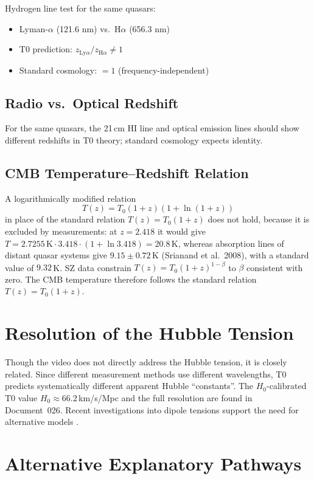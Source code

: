 	Hydrogen line test for the same quasars:
	\begin{itemize}
		\item Lyman-$\alpha$ (121.6 nm) vs.\ H$\alpha$ (656.3 nm)
		\item T0 prediction: $z_{\mathrm{Ly}\alpha} / z_{\mathrm{H}\alpha} \neq 1$
		\item Standard cosmology: $= 1$ (frequency-independent)
	\end{itemize}

	\subsection{Radio vs.\ Optical Redshift}
	For the same quasars, the 21\,cm HI line and optical emission lines should show different redshifts in T0 theory; standard cosmology expects identity.

	\subsection{CMB Temperature--Redshift Relation}
	A logarithmically modified relation
	$$T(z) = T_0(1+z)(1+\ln(1+z))$$
	in place of the standard relation $T(z) = T_0(1+z)$ does not hold, because it is excluded by measurements: at $z=2.418$ it would give $T=2.7255\,\text{K}\cdot 3.418\cdot(1+\ln 3.418)=20.8$\,K, whereas absorption lines of distant quasar systems give $9.15\pm0.72$\,K (Srianand et al.\ 2008), with a standard value of $9.32$\,K. SZ data constrain $T(z)=T_0(1+z)^{1-\beta}$ to $\beta$ consistent with zero. The CMB temperature therefore follows the standard relation $T(z) = T_0(1+z)$.

\section{Resolution of the Hubble Tension}

	Though the video does not directly address the Hubble tension, it is closely related. Since different measurement methods use different wavelengths, T0 predicts systematically different apparent Hubble ``constants''. The $H_0$-calibrated T0 value $H_0 \approx 66.2\,$km/s/Mpc and the full resolution are found in Document~026. Recent investigations into dipole tensions support the need for alternative models \cite{landstry2025, bengaly2025}.

\section{Alternative Explanatory Pathways}

